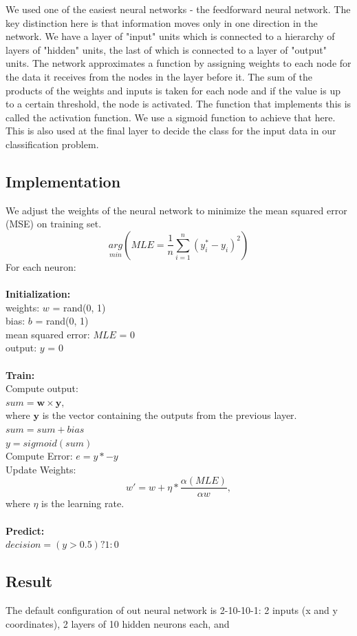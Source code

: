 \documentclass[11pt,letterpaper]{article}
\begin{document}
We used one of the easiest neural networks - the feedforward neural network. The key distinction here is that information moves only in one direction in the network. We have a layer of "input" units which is connected to a hierarchy of layers of "hidden" units, the last of which is connected to a layer of "output" units. The network approximates a function by assigning weights to each node for the data it receives from the nodes in the layer before it. The sum of the products of the weights and inputs is taken for each node and if the value is up to a certain threshold, the node is activated. The function that implements this is called the activation function. We use a sigmoid function to achieve that here. This is also used at the final layer to decide the class for the input data in our classification problem.

\subsection{Implementation}
\label{sect:pdf}
We adjust the weights of the neural network to minimize the mean squared error (MSE) on training set.
$$\underset{min}{arg} (MLE = \frac{1}{n}\sum_{i=1}^n(y_i^*-y_i)^2)$$
For each neuron:\\\\
\textbf{Initialization:}\\
weights: $w$ = rand(0, 1)\\
bias: $b$ = rand(0, 1)\\
mean squared error: $MLE$ = 0\\
output: $y$ = 0\\\\
\textbf{Train:}\\
Compute output: \\
$sum = \boldsymbol{w}\times \boldsymbol{y},$\\
where $\boldsymbol{y}$ is the vector containing the outputs from the previous layer.\\
$sum = sum + bias$\\
$y = sigmoid(sum)$\\
Compute Error: $e = y* - y$\\
Update Weights:
$$w' = w + \eta *\frac{\alpha (MLE)}{\alpha w},$$
where $\eta$ is the learning rate.\\\\
\textbf{Predict:}\\
$decision = (y > 0.5) ? 1:0$

\subsection{Result}
The default configuration of out neural network is 2-10-10-1: 2 inputs (x and y coordinates), 2 layers of 10 hidden neurons each, and
\end{document}
